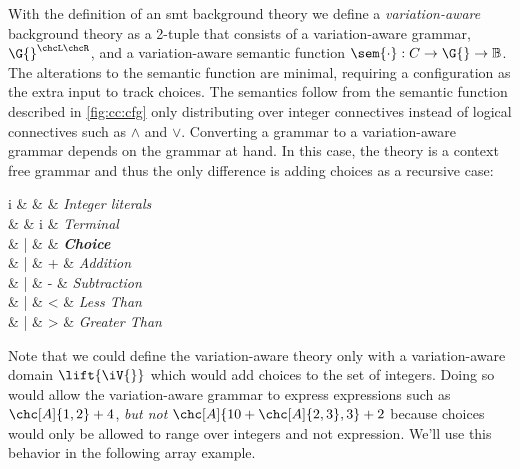 With the definition of an \ac{smt} background theory we define a
\emph{variation-aware} background theory as a 2-tuple that consists of a
variation-aware grammar, $\G{}^{\chcL\chcR}$, and a variation-aware semantic
function $\sem{\cdot} : C \rightarrow \G{} \rightarrow \mathbb{B}$. The
alterations to the semantic function are minimal, requiring a configuration as
the extra input to track choices. The semantics follow from the semantic
function described in \autoref{fig:cc:cfg} only distributing over integer
connectives instead of logical connectives such as $\wedge$ and $\vee$.
Converting a grammar to a variation-aware grammar depends on the grammar at
hand. In this case, the theory is a context free grammar and thus the only
difference is adding choices as a recursive case:
%
\begin{syntax}
  i & \in{} & 
  & \textit{Integer literals} \\[1.5ex]

   & \Coloneqq{} & i    & \textit{Terminal} \\
  & | &  & \textit{\textbf{Choice}} \\
  & | &  +      & \textit{Addition} \\
  & | &  -      & \textit{Subtraction} \\
  & | &  <      & \textit{Less Than} \\
  & | &  >    & \textit{Greater Than} \\
\end{syntax}
%
Note that we could define the variation-aware theory only with a variation-aware
domain $\lift{\iV{}}$ which would add choices to the set of integers. Doing so
would allow the variation-aware grammar to express expressions such as
$\chc[A]{1, 2} + 4$, \emph{but not} $\chc[A]{10 + \chc[A]{2,3}, 3} + 2$ because
choices would only be allowed to range over integers and not expression. We'll
use this behavior in the following array example.

